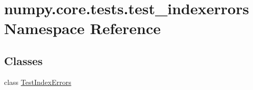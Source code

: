 \hypertarget{namespacenumpy_1_1core_1_1tests_1_1test__indexerrors}{}\section{numpy.\+core.\+tests.\+test\+\_\+indexerrors Namespace Reference}
\label{namespacenumpy_1_1core_1_1tests_1_1test__indexerrors}
\subsection*{Classes}
\begin{DoxyCompactItemize}
\item 
class \hyperlink{classnumpy_1_1core_1_1tests_1_1test__indexerrors_1_1TestIndexErrors}{Test\+Index\+Errors}
\end{DoxyCompactItemize}

